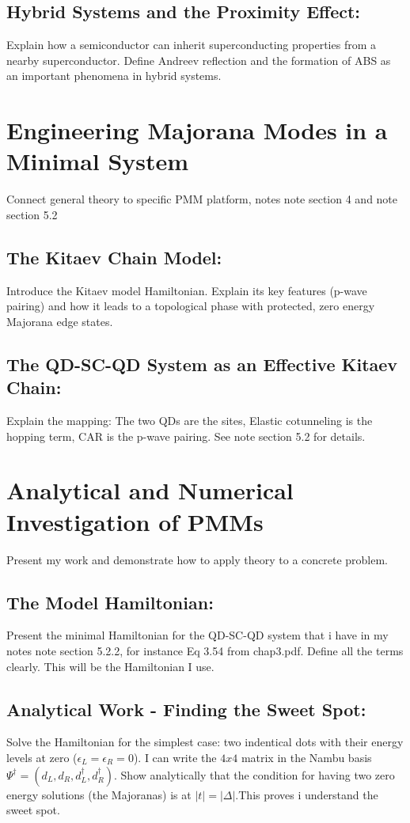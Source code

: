 \documentclass[11pt, letterpaper, titlepage]{article}
\begin{document}
\subsection{Hybrid Systems and the Proximity Effect:} Explain how a semiconductor can inherit superconducting properties from a nearby superconductor. Define Andreev reflection and the formation of ABS as an important phenomena in hybrid systems.\\

\section{Engineering Majorana Modes in a Minimal System}
Connect general theory to specific PMM platform, notes note section 4 and note section 5.2\\
\subsection{The Kitaev Chain Model:} Introduce the Kitaev model Hamiltonian. Explain its key features (p-wave pairing) and how it leads to a topological phase with protected, zero energy Majorana edge states.\\
\subsection{The QD-SC-QD System as an Effective Kitaev Chain:} Explain the mapping: The two QDs are the sites, Elastic cotunneling is the hopping term, CAR is the p-wave pairing. See note section 5.2 for details.\\

\section{Analytical and Numerical Investigation of PMMs}
Present my work and demonstrate how to apply theory to a concrete problem.\\
\subsection{The Model Hamiltonian:} Present the minimal Hamiltonian for the QD-SC-QD system that i have in my notes note section 5.2.2, for instance Eq 3.54 from chap3.pdf. Define all the terms clearly. This will be the Hamiltonian I use.\\
\subsection{Analytical Work - Finding the Sweet Spot:} Solve the Hamiltonian for the simplest case: two indentical dots with their energy levels at zero ($ϵ_L = ϵ_R = 0$). I can write the $4x4$ matrix in the Nambu basis $Ψ^{†}= (d_L, d_R, d_L^{†}, d_R^{†})$. Show analytically that the condition for having two zero energy solutions (the Majoranas) is at $|t| = |Δ|$.This proves i understand the sweet spot.\\ 
\end{document}

